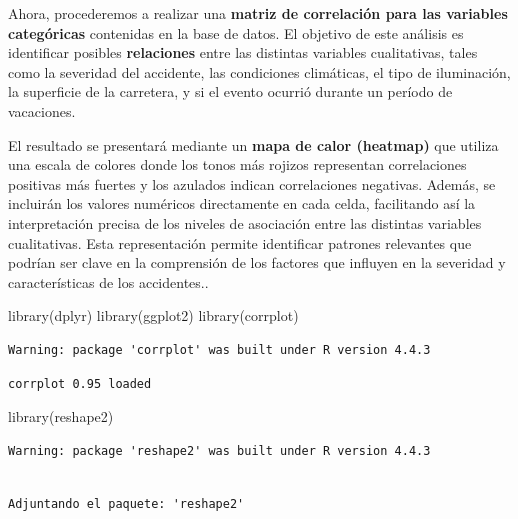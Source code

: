 \documentclass[
  letterpaper,
  DIV=11,
  numbers=noendperiod]{scrartcl}
\newenvironment{Shaded}{\begin{snugshade}}{\end{snugshade}}
\newcommand{\FunctionTok}[1]{\textcolor[rgb]{0.28,0.35,0.67}{#1}}
\newcommand{\NormalTok}[1]{\textcolor[rgb]{0.00,0.23,0.31}{#1}}
\begin{document}
Ahora, procederemos a realizar una \textbf{matriz de correlación para
las variables categóricas} contenidas en la base de datos. El objetivo
de este análisis es identificar posibles \textbf{relaciones} entre las
distintas variables cualitativas, tales como la severidad del accidente,
las condiciones climáticas, el tipo de iluminación, la superficie de la
carretera, y si el evento ocurrió durante un período de vacaciones.

El resultado se presentará mediante un \textbf{mapa de calor (heatmap)}
que utiliza una escala de colores donde los tonos más rojizos
representan correlaciones positivas más fuertes y los azulados indican
correlaciones negativas. Además, se incluirán los valores numéricos
directamente en cada celda, facilitando así la interpretación precisa de
los niveles de asociación entre las distintas variables cualitativas.
Esta representación permite identificar patrones relevantes que podrían
ser clave en la comprensión de los factores que influyen en la severidad
y características de los accidentes..

\begin{Shaded}
\begin{Highlighting}[]
\FunctionTok{library}\NormalTok{(dplyr)}
\FunctionTok{library}\NormalTok{(ggplot2)}
\FunctionTok{library}\NormalTok{(corrplot)}
\end{Highlighting}
\end{Shaded}

\begin{verbatim}
Warning: package 'corrplot' was built under R version 4.4.3
\end{verbatim}

\begin{verbatim}
corrplot 0.95 loaded
\end{verbatim}

\begin{Shaded}
\begin{Highlighting}[]
\FunctionTok{library}\NormalTok{(reshape2)}
\end{Highlighting}
\end{Shaded}

\begin{verbatim}
Warning: package 'reshape2' was built under R version 4.4.3
\end{verbatim}

\begin{verbatim}

Adjuntando el paquete: 'reshape2'
\end{verbatim}
\end{document}

